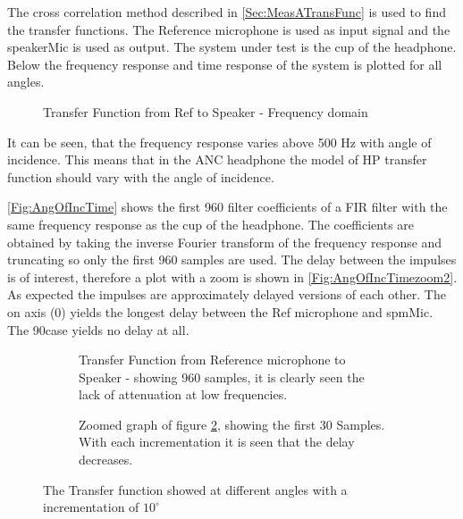 The cross correlation method described in \autoref{Sec:MeasATransFunc} is used to find the transfer functions. The Reference microphone is used as input signal and the speakerMic is used as output. The system under test is the cup of the headphone. 
Below the frequency response and time response of the system is plotted for all angles. 
\begin{figure}[H]
	
	\caption{Transfer Function from Ref to Speaker - Frequency domain}
	\label{Fig:AngOfIncFreq}
\end{figure}
It can be seen, that the frequency response varies above 500 Hz with angle of incidence. This means that in the ANC headphone the model of HP transfer function should vary with the angle of incidence.  


\autoref{Fig:AngOfIncTime} shows the first 960 filter coefficients of a FIR filter with the same frequency response as the cup of the headphone. The coefficients are obtained by taking the inverse Fourier transform of the frequency response and truncating so only the first 960 samples are used.   The delay between the impulses is of interest, therefore a plot with a zoom is shown in \autoref{Fig:AngOfIncTimezoom2}.
As expected the impulses are approximately delayed versions of each other. The on axis (0\degrees) yields the longest delay between the Ref microphone and spmMic. The 90\degrees case yields no delay at all. 


\begin{figure}[H]
	\centering
	\begin{subfigure}[b]{\textwidth}
	
	\caption{Transfer Function from Reference microphone to Speaker - showing 960 samples, it is clearly seen the lack of attenuation at low frequencies.}
	\label{Fig:AngOfIncTime}
	\end{subfigure} 
	\begin{subfigure}[b]{\textwidth}
	
	\caption{Zoomed graph of figure \ref{Fig:AngOfIncTime}, showing the first 30 Samples. With each incrementation it is seen that the delay decreases.}
	\label{Fig:AngOfIncTimezoom2}
	\end{subfigure}
	\caption{The Transfer function showed at different angles with a incrementation of $10^{\circ}$}
	\label{fig:AngOfIncResult}
\end{figure}


